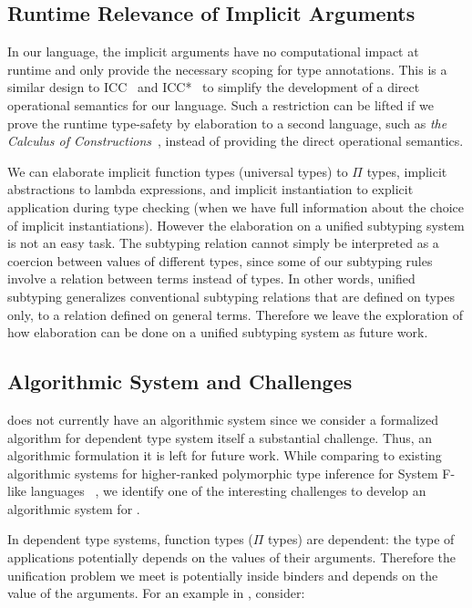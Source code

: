 \subsection{Runtime Relevance of Implicit Arguments}

In our language, the implicit arguments have no computational impact at runtime
and only provide the necessary scoping for type annotations. This is
a similar design to ICC~\cite{miquel2001implicit} and
ICC*~\cite{barras2008implicit} to simplify the development of a direct
operational semantics for our language. Such a restriction can be lifted if we
prove the runtime type-safety by elaboration to a second language,
such as \emph{the Calculus of Constructions}~\cite{coc},
instead of providing the direct operational semantics.

We can elaborate implicit function types (universal types) to $\Pi$ types,
implicit abstractions to lambda expressions, and implicit instantiation to explicit
application during type checking (when we have full information about the
choice of implicit instantiations). However the elaboration on a unified subtyping
system is not an easy task. The subtyping relation cannot simply be interpreted
as a coercion between values of different types, since some of our subtyping
rules involve a relation between terms instead of types. In other words,
unified subtyping generalizes conventional subtyping relations that are defined
on types only, to a relation defined on general terms.
Therefore we leave the exploration of how elaboration can be done
on a unified subtyping system as future work.

\subsection{Algorithmic System and Challenges}

\name does not currently have an algorithmic system since we
consider a formalized algorithm for dependent type system itself a
substantial challenge. Thus, an algorithmic formulation it is left for future work.
While comparing to existing algorithmic systems
for higher-ranked polymorphic type inference for System F-like languages
~\cite{dunfield2013complete,zhao19mechanical},
we identify one of the interesting challenges to develop an algorithmic system for \name.

In dependent type systems, function types ($\Pi$ types) are dependent:
the type of applications potentially depends on the values of their arguments.
Therefore the unification problem we meet is potentially inside binders and
depends on the value of the arguments. For an example in \name, consider:

